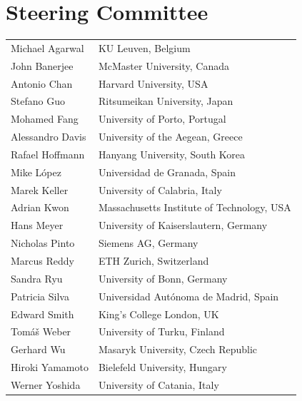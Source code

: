 \documentclass[runningheads]{llncs}
\begin{document}
\section*{Steering Committee}
\begin{longtable}{p{}p{}}
Michael Agarwal     & KU Leuven, Belgium\\
John Banerjee       & McMaster University, Canada\\
Antonio Chan        & Harvard University, USA\\
Stefano Guo         & Ritsumeikan University, Japan\\
Mohamed Fang        & University of Porto, Portugal\\
Alessandro Davis    & University of the Aegean, Greece\\
Rafael Hoffmann     & Hanyang University, South Korea\\
Mike L\'{o}pez      & Universidad de Granada, Spain\\
Marek Keller        & University of Calabria, Italy\\
Adrian Kwon         & Massachusetts Institute of Technology, USA\\
Hans Meyer          & University of Kaiserslautern, Germany\\
Nicholas Pinto      & Siemens AG, Germany\\
Marcus Reddy        & ETH Zurich, Switzerland\\
Sandra Ryu          & University of Bonn, Germany\\
Patricia Silva      & Universidad Aut\'{o}noma de Madrid, Spain\\
Edward  Smith       & King's College London, UK\\
Tom\'{a}\v{s} Weber & University of Turku, Finland\\
Gerhard Wu          & Masaryk University, Czech Republic\\
Hiroki Yamamoto     & Bielefeld University, Hungary\\
Werner Yoshida      & University of Catania, Italy\\
\end{longtable}
\end{document}
